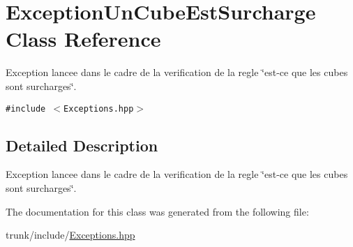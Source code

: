 \hypertarget{classExceptionUnCubeEstSurcharge}{
\section{ExceptionUnCubeEstSurcharge Class Reference}
\label{classExceptionUnCubeEstSurcharge}
}
Exception lancee dans le cadre de la verification de la regle \char`\"{}est-ce que les cubes sont surcharges\char`\"{}.  


{\tt \#include $<$Exceptions.hpp$>$}



\subsection{Detailed Description}
Exception lancee dans le cadre de la verification de la regle \char`\"{}est-ce que les cubes sont surcharges\char`\"{}. 

The documentation for this class was generated from the following file:\begin{CompactItemize}
\item 
trunk/include/\hyperlink{Exceptions_8hpp}{Exceptions.hpp}\end{CompactItemize}

